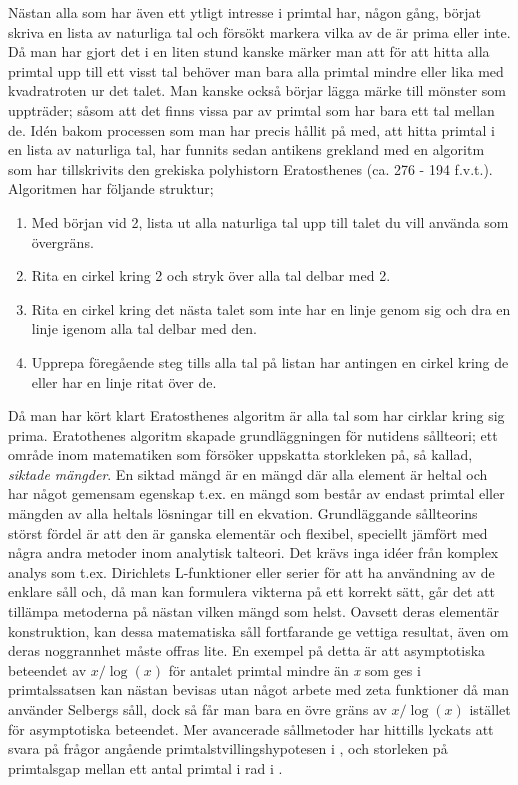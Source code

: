 Nästan alla som har även ett ytligt intresse i primtal har, någon gång, börjat skriva en lista av naturliga tal och försökt markera vilka av de är prima eller inte. Då man har gjort det i en liten stund kanske märker man att för att hitta alla primtal upp till ett visst tal behöver man bara alla primtal mindre eller lika med kvadratroten ur det talet. Man kanske också börjar lägga märke till mönster som uppträder; såsom att det finns vissa par av primtal som har bara ett tal mellan de. Idén bakom processen som man har precis hållit på med, att hitta primtal i en lista av naturliga tal, har funnits sedan antikens grekland med en algoritm som har tillskrivits den grekiska polyhistorn Eratosthenes (ca. 276 - 194 f.v.t.). Algoritmen har följande struktur;
\begin{enumerate}
    \item Med början vid 2, lista ut alla naturliga tal upp till talet du vill använda som övergräns.
    \item Rita en cirkel kring 2 och stryk över alla tal delbar med 2.
    \item Rita en cirkel kring det nästa talet som inte har en linje genom sig och dra en linje igenom alla tal delbar med den.
    \item Upprepa föregående steg tills alla tal på listan har antingen en cirkel kring de eller har en linje ritat över de. 
\end{enumerate}
Då man har kört klart Eratosthenes algoritm är alla tal som har cirklar kring sig prima. Eratothenes algoritm skapade grundläggningen för nutidens sållteori; ett område inom matematiken som försöker uppskatta storkleken på, så kallad, \textit{siktade mängder}. En siktad mängd är en mängd där alla element är heltal och har något gemensam egenskap t.ex. en mängd som består av endast primtal eller mängden av alla heltals lösningar till en ekvation. Grundläggande sållteorins störst fördel är att den är ganska elementär och flexibel, speciellt jämfört med några andra metoder inom analytisk talteori. Det krävs inga idéer från komplex analys som t.ex. Dirichlets L-funktioner eller serier för att ha användning av de enklare såll och, då man kan formulera vikterna på ett korrekt sätt, går det att tillämpa metoderna på nästan vilken mängd som helst. Oavsett deras elementär konstruktion, kan dessa matematiska såll fortfarande ge vettiga resultat, även om deras noggrannhet måste offras lite. En exempel på detta är att asymptotiska beteendet av \(x/\log(x)\) för antalet primtal mindre än \textit{x} som ges i primtalssatsen kan nästan bevisas utan något arbete med zeta funktioner då man använder Selbergs såll, dock så får man bara en övre gräns av \(x/\log(x)\) istället för asymptotiska beteendet. Mer avancerade sållmetoder har hittills lyckats att svara på frågor angående primtalstvillingshypotesen i \cite{chen2Prime}, och storleken på primtalsgap mellan ett antal primtal i rad i \cite{mayBound}.

